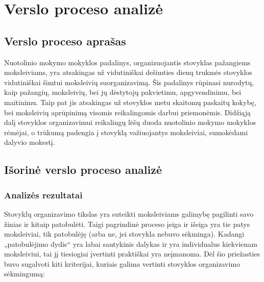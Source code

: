 \chapter{Verslo proceso analizė}


\section{Verslo proceso aprašas}

Nuotolinio mokymo mokyklos padalinys, organizuojantis stovyklas pažangiems
moksleiviams, yra atsakingas už vidutiniškai dešimties dienų trukmės
stovyklos vidutiniškai šimtui moksleivių suorganizavimą. Šis padalinys
rūpinasi nurodytų, kaip pažangių, moksleivių, bei jų dėstytojų pakvietimu, 
apgyvendinimu, bei maitinimu. Taip pat jis atsakingas už stovyklos metu 
skaitomų paskaitų kokybę, bei moksleivių aprūpinimą visomis reikalingomis
darbui priemonėmis. Didžiąją dalį stovyklos organizavimui reikalingų lėšų
duoda nuotolinio mokymo mokyklos rėmėjai, o trūkumą padengia į stovyklą
važiuojantys moksleiviai, sumokėdami dalyvio mokestį.

\section{Išorinė verslo proceso analizė}

\subsection{Analizės rezultatai}

Stovyklų organizavimo tikslas yra suteikti moksleiviams galimybę pagilinti
savo žinias ir kitaip patobulėti. Taigi pagrindinė proceso įeiga ir išeiga
yra tie patys moksleiviai, tik patobulėję (arba ne, jei stovykla nebuvo
sėkminga). Kadangi „patobulėjimo dydis“ yra labai santykinis dalykas ir yra 
individualus kiekvienam moksleiviui, tai jį tiesiogiai įvertinti praktiškai
yra neįmanoma. Dėl šio priežasties buvo sugalvoti kiti kriterijai, kuriais
galima vertinti stovyklos organizavimo sėkmingumą:

